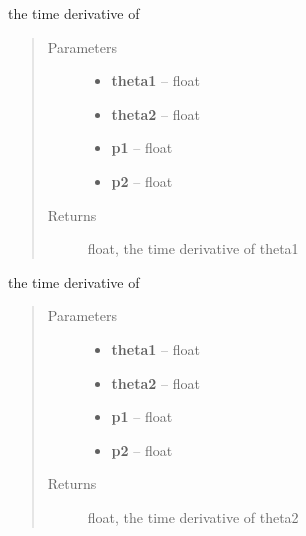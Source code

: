 \documentclass[letterpaper,10pt,english]{sphinxmanual}
\begin{document}

\begin{fulllineitems}
\label{index:doublePendulum.dtheta1}
the time derivative of 
\begin{quote}\begin{description}
\item[{Parameters}] \leavevmode\begin{itemize}
\item {} 
\textbf{theta1} -- float

\item {} 
\textbf{theta2} -- float

\item {} 
\textbf{p1} -- float

\item {} 
\textbf{p2} -- float

\end{itemize}

\item[{Returns}] \leavevmode
float, the time derivative of theta1

\end{description}\end{quote}

\end{fulllineitems}


\begin{fulllineitems}
\label{index:doublePendulum.dtheta2}
the time derivative of 
\begin{quote}\begin{description}
\item[{Parameters}] \leavevmode\begin{itemize}
\item {} 
\textbf{theta1} -- float

\item {} 
\textbf{theta2} -- float

\item {} 
\textbf{p1} -- float

\item {} 
\textbf{p2} -- float

\end{itemize}

\item[{Returns}] \leavevmode
float, the time derivative of theta2

\end{description}\end{quote}

\end{fulllineitems}
\end{document}
